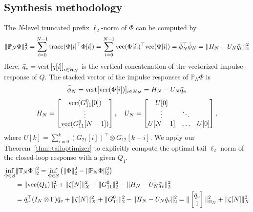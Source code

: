 \subsection{Synthesis methodology}
The \(N\)-level truncated prefix $\ell_2$-norm of $\Phi$ can be computed by
\begin{equation*}
    \|\mathbb{P}_N \Phi\|_2^2 = \sum_{i=0}^{N-1}\mathrm{trace}(\Phi[i]^\top \Phi[i]) = \sum_{i=0}^{N-1}{\mathrm{vec}}(\Phi[i])^\top {\mathrm{vec}}(\Phi[i]) = \bar{\phi}_N^\top \bar{\phi}_N = \|H_N - U_N \bar{q}_v\|_2^2
\end{equation*}
Here, $\bar{q}_v = {\mathrm{vert}}\left[q[i]\right]_{i \in \mathcal{H}_N}$ is the vertical concatenation of the vectorized impulse response of $Q$. The stacked vector of the impulse responses of $\mathbb{P}_N \Phi$ is
\begin{equation}\label{eqn:phiN_q}
    \bar{\phi}_N = {\mathrm{vert}}[{\mathrm{vec}}(\Phi[i])]_{i \in \mathcal{H}_N} = H_N - U_N \bar{q}_v    
\end{equation}
\[
H_N =
\begin{bmatrix}
{\mathrm{vec}}(G_{11}^0[0]) \\ \vdots \\ {\mathrm{vec}}(G_{11}^0[N-1])
\end{bmatrix},\quad
U_N =
\begin{bmatrix}
U[0] & & \\
\vdots & \ddots & \\
U[N-1] & \hdots & U[0]
\end{bmatrix},
\]
where $U[k] = \sum_{i=0}^{k} (G_{21}[i])^\top \otimes G_{12}[k-i]$.
We apply our Theorem~\ref{thm::tailoptimizer} to explicitly compute the optimal tail \(\ell_2\) norm of the closed-loop response with a given \(Q_1\).
\begin{equation*}
\begin{split}
\underset{\Phi\in\mathcal{S}}{\inf} & \|\mathbb{T}_N \Phi\|_2^2  = \underset{\Phi\in\mathcal{S}}{\inf} \left(\|\Phi\|_2^2 - \|\mathbb{P}_N \Phi\|_2^2\right) \\
& = \|{\mathrm{vec}}(Q_1)\|_\Gamma^2 + \| \zeta[N]\|_X^2 + \|G_{11}^0\|_2^2 - \|H_N - U_N \bar{q}_v\|_2^2\\
& = \bar{q}_v^\top (I_N \otimes \Gamma) \bar{q}_v + \|\zeta[N]\|_X^2 + \|G_{11}^0\|_2^2 - \|H_N - U_N \bar{q}_v\|_2^2 = \|\begin{bmatrix} \bar{q}_v \\ 1 \end{bmatrix} \|_{\Pi_N}^2 + \|\zeta[N]\|_X^2
\end{split}
\end{equation*}
